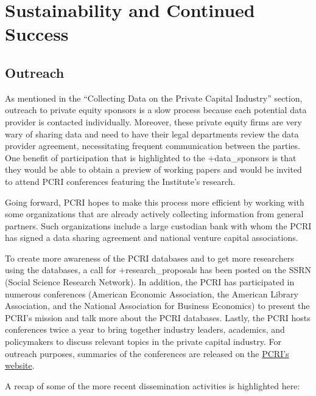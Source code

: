 \documentclass[
]{book}
\begin{document}
\hypertarget{sustainability-and-continued-success-3}{%
\section{Sustainability and Continued Success}\label{sustainability-and-continued-success-3}}

\hypertarget{outreach-3}{%
\subsection{Outreach}\label{outreach-3}}

As mentioned in the ``Collecting Data on the Private Capital Industry'' section, outreach to private equity sponsors is a slow process because each potential data provider is contacted individually. Moreover, these private equity firms are very wary of sharing data and need to have their legal departments review the data provider agreement, necessitating frequent communication between the parties. One benefit of participation that is highlighted to the +data\_sponsors\textbar{} is that they would be able to obtain a preview of working papers and would be invited to attend PCRI conferences featuring the Institute's research.

Going forward, PCRI hopes to make this process more efficient by working with some organizations that are already actively collecting information from general partners. Such organizations include a large custodian bank with whom the PCRI has signed a data sharing agreement and national venture capital associations.

To create more awareness of the PCRI databases and to get more researchers using the databases, a call for +research\_proposals\textbar{} has been posted on the SSRN (Social Science Research Network). In addition, the PCRI has participated in numerous conferences (American Economic Association, the American Library Association, and the National Association for Business Economics) to present the PCRI's mission and talk more about the PCRI databases. Lastly, the PCRI hosts conferences twice a year to bring together industry leaders, academics, and policymakers to discuss relevant topics in the private capital industry. For outreach purposes, summaries of the conferences are released on the \href{http://www.privatecapitalresearchinstitute.org/}{PCRI's website}.

A recap of some of the more recent dissemination activities is highlighted here:
\end{document}
